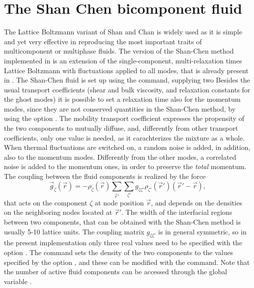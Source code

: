 \section{The Shan Chen bicomponent fluid\label{sec:shanchen}}
The Lattice Boltzmann variant of Shan and Chan\cite{...} is widely
used as it is simple and yet very effective in reproducing the most
important traits of multicomponent or multiphase fluids. The version
of the Shan-Chen method implemented in \es is an extension of the
single-component, multi-relaxation times Lattice Boltzmann with
fluctuations applied to all modes, that is already present in \es.
The Shan-Chen fluid is set up using the  command,
supplying two  Besides the usual transport coefficients (shear and
bulk viscosity, and relaxation constants for the ghost modes) it
is possible to set a relaxation time also for the momentum modes,
since they are not conserved quantities in the Shan-Chen method,
by using the option . The mobility transport coefficient
expresses the propensity of the two components to mutually diffuse,
and, differently from other transport coefficients, only one value
is needed, as it carachterizes the mixture as a whole. When thermal
fluctuations are switched on, a random noise is added, in addition,
also to the momentum modes. Differently from the other modes, a
correlated noise is added to the momentum ones, in order to preserve
the \emph{total} momentum. The coupling between the fluid components
is realized by the force
\begin{equation}
 \vec{g}_{\zeta}(\vec{r}) =  - \rho_{\zeta}(\vec{r})
 \sum_{\vec{r}'}\sum_{\zeta'}  g_{\zeta \zeta'} \rho_{\zeta'}
 (\vec{r}') (\vec{r}'-\vec{r}),
\end{equation} that acts on the component $\zeta$ at node position
$\vec{r}$, and depends on the densities on the neighboring nodes
located at $\vec{r}'$.  The width of the interfacial regions between
two components, that can be obtained with the Shan-Chen method is
usually 5-10 lattice units.  The coupling matrix $g_{\zeta \zeta'}$
is in general symmetric, so in the present implementation only three
real values need to be specified with the option .
The  command sets the density of the two components
to the values specified by the option , and these can be
modified with the  command. Note that the number of
active fluid components can be accessed through the global variable
.


